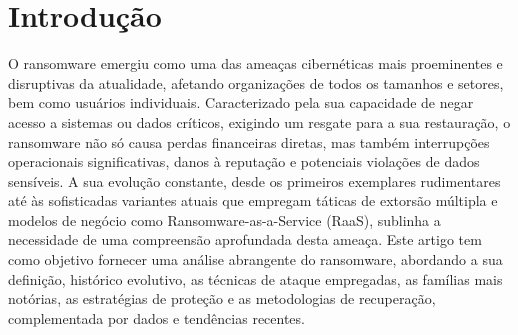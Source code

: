 
\section{Introdução}

O ransomware emergiu como uma das ameaças cibernéticas mais proeminentes e disruptivas da atualidade, afetando organizações de todos os tamanhos 
e setores, bem como usuários individuais. Caracterizado pela sua capacidade de negar acesso a sistemas ou dados críticos, exigindo um resgate para a sua 
restauração, o ransomware não só causa perdas financeiras diretas, mas também interrupções operacionais significativas, danos à reputação e potenciais 
violações de dados sensíveis. A sua evolução constante, desde os primeiros exemplares rudimentares até às sofisticadas variantes atuais que empregam 
táticas de extorsão múltipla e modelos de negócio como Ransomware-as-a-Service (RaaS), sublinha a necessidade de uma compreensão aprofundada desta ameaça. 
Este artigo tem como objetivo fornecer uma análise abrangente do ransomware, abordando a sua definição, histórico evolutivo, as técnicas de ataque empregadas, 
as famílias mais notórias, as estratégias de proteção e as metodologias de recuperação, complementada por dados e tendências recentes.





